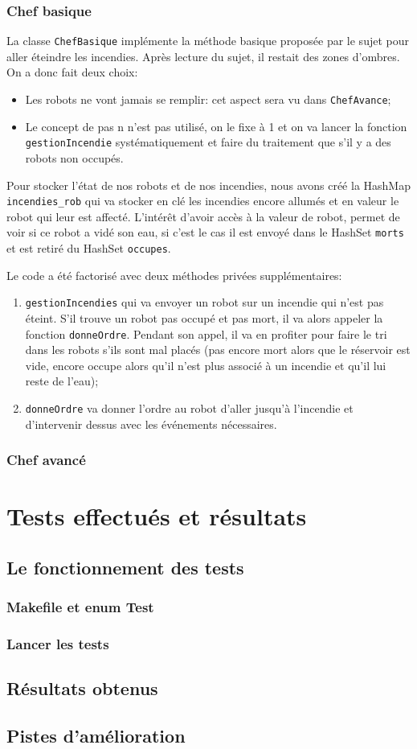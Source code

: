 \documentclass[a4paper,8pt]{article} %
\begin{document}
\subsubsection{Chef basique}
La  classe \texttt{ChefBasique} implémente la méthode basique proposée par le sujet pour aller éteindre les incendies.
Après lecture du sujet, il restait des zones d'ombres. On a donc fait deux choix:
\begin{itemize}
    \item Les robots ne vont jamais se remplir: cet aspect sera vu dans \texttt{ChefAvance};
    \item Le concept de pas n n'est pas utilisé, on le fixe à 1 et on va lancer la fonction \texttt{gestionIncendie} systématiquement 
    et faire du traitement que s'il y a des robots non occupés.
\end{itemize}

Pour stocker l'état de nos robots et de nos incendies, nous avons créé la HashMap \texttt{incendies\_rob} 
qui va stocker en clé les incendies encore allumés et en valeur le robot qui leur est affecté. L'intérêt d'avoir accès à la valeur de robot,
permet de voir si ce robot a vidé son eau, si c'est le cas il est envoyé dans le HashSet \texttt{morts} et est retiré du HashSet \texttt{occupes}.

Le code a été factorisé avec deux méthodes privées supplémentaires:
\begin{enumerate}
    \item \texttt{gestionIncendies} qui va envoyer un robot sur un incendie qui n'est pas éteint. S'il trouve un robot pas occupé et pas mort,
    il va alors appeler la fonction \texttt{donneOrdre}. Pendant son appel, il va en profiter pour faire le tri dans les robots s'ils sont
    mal placés (pas encore mort alors que le réservoir est vide, encore occupe alors qu'il n'est plus associé à un incendie et qu'il lui reste
    de l'eau);
    \item \texttt{donneOrdre} va donner l'ordre au robot d'aller jusqu'à l'incendie et d'intervenir dessus avec les événements nécessaires.
\end{enumerate}

\subsubsection{Chef avancé}
\section{Tests effectués et résultats}
\subsection{Le fonctionnement des tests}
\subsubsection{Makefile et enum Test}
\subsubsection{Lancer les tests}
\subsection{Résultats obtenus}
\subsection{Pistes d'amélioration}
\end{document}

